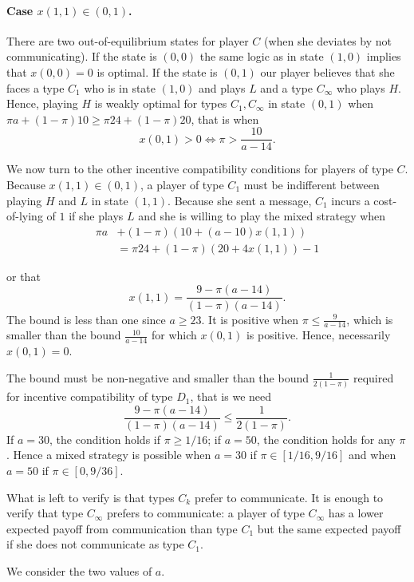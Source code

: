 \documentclass[12pt]{article}
\theoremstyle{definition}
\theoremstyle{remark}
\begin{document}
\paragraph{Case $x(1,1)\in (0,1)$.} There are two out-of-equilibrium states for player $C$ (when she deviates by not communicating). If the state is $(0,0)$  the same logic as in state $(1,0)$ implies that $x(0,0)=0$ is optimal. If the state is $(0,1)$  our player believes that she faces a type $C_1$ who is in state $(1,0)$ and plays $L$ and a type $C_\infty$ who plays $H$. Hence, playing $H$ is weakly optimal for types $C_1,C_\infty$ in state $(0,1)$ when $\pi a+(1-\pi)10\geq \pi 24 +(1-\pi)20$, that is when \[x(0,1)>0\Leftrightarrow \pi> \frac{10}{a-14}.\]

We now turn to the other incentive compatibility conditions for players of type $C$.  
Because $x(1,1)\in(0,1)$, a player of type $C_1$ must be indifferent between playing $H$ and $L$ in state $(1,1)$. Because she sent a message, $C_1$ incurs a cost-of-lying of $1$ if she plays $L$ and she is willing to play the mixed strategy when
%
\[
\begin{split}
	\pi a &+(1-\pi)(10+(a-10)x(1,1)) \\
	&=\pi 24 +(1-\pi)(20+4x(1,1)) - 1
\end{split}
\]

or that 
\begin{equation}\label{eq:cond-x11}
	x(1,1)= \frac{9-\pi (a-14)}{(1-\pi)(a-14)}.
\end{equation}
The bound is less than one since $a\geq 23$. It is positive when $\pi\leq \frac{9}{a-14}$, which is smaller than the bound $\frac{10}{a-14}$ for which $x(0,1)$ is positive. Hence, necessarily $x(0,1)=0$.

The bound must be non-negative and smaller than the bound $\frac{1}{2(1-\pi)}$ required for incentive compatibility of type $D_1$, that is we need
\[
\frac{9-\pi (a-14)}{(1-\pi)(a-14)}\leq\frac{1}{2(1-\pi)}.
\]
If $a=30$, the condition holds if $\pi\geq 1/16$; if $a=50$, the condition holds for any $\pi$. Hence a mixed strategy is possible when $a=30$ if $\pi\in[1/16,9/16]$ and when $a=50$ if $\pi\in[0,9/36]$.

What is left to verify is that types $C_k$ prefer to communicate. It is enough to verify that type $C_\infty$ prefers to communicate: a player of type $C_\infty$ has a lower expected payoff from communication than type $C_1$ but the same expected payoff if she does not communicate as type $C_1$.


We consider the two values of $a$.
\end{document}
